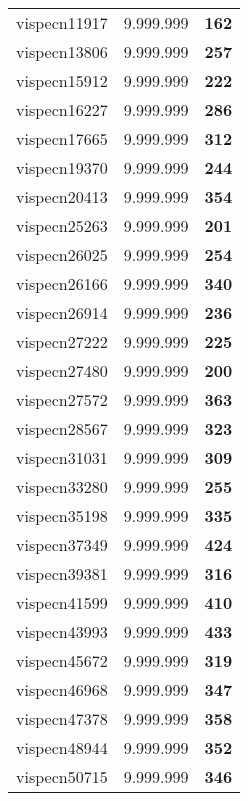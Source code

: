 \begin{tabular}{cc||c}
vispecn11917     & 9.999.999        & {\bf 162}       \\ 
vispecn13806     & 9.999.999        & {\bf 257}       \\ 
vispecn15912     & 9.999.999        & {\bf 222}       \\ 
vispecn16227     & 9.999.999        & {\bf 286}       \\ 
vispecn17665     & 9.999.999        & {\bf 312}       \\ 
vispecn19370     & 9.999.999        & {\bf 244}       \\ 
vispecn20413     & 9.999.999        & {\bf 354}       \\ 
vispecn25263     & 9.999.999        & {\bf 201}       \\ 
vispecn26025     & 9.999.999        & {\bf 254}       \\ 
vispecn26166     & 9.999.999        & {\bf 340}       \\ 
vispecn26914     & 9.999.999        & {\bf 236}       \\ 
vispecn27222     & 9.999.999        & {\bf 225}       \\ 
vispecn27480     & 9.999.999        & {\bf 200}       \\ 
vispecn27572     & 9.999.999        & {\bf 363}       \\ 
vispecn28567     & 9.999.999        & {\bf 323}       \\ 
vispecn31031     & 9.999.999        & {\bf 309}       \\ 
vispecn33280     & 9.999.999        & {\bf 255}       \\ 
vispecn35198     & 9.999.999        & {\bf 335}       \\ 
vispecn37349     & 9.999.999        & {\bf 424}       \\ 
vispecn39381     & 9.999.999        & {\bf 316}       \\ 
vispecn41599     & 9.999.999        & {\bf 410}       \\ 
vispecn43993     & 9.999.999        & {\bf 433}       \\ 
vispecn45672     & 9.999.999        & {\bf 319}       \\ 
vispecn46968     & 9.999.999        & {\bf 347}       \\ 
vispecn47378     & 9.999.999        & {\bf 358}       \\ 
vispecn48944     & 9.999.999        & {\bf 352}       \\ 
vispecn50715     & 9.999.999        & {\bf 346}       \\ 

\end{tabular}
